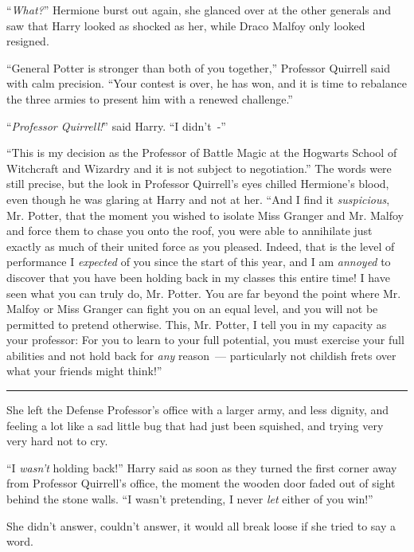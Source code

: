 ``\emph{What?}'' Hermione burst out again, she glanced over at the other generals and saw that Harry looked as shocked as her, while Draco Malfoy only looked resigned.

``General Potter is stronger than both of you together,'' Professor Quirrell said with calm precision. ``Your contest is over, he has won, and it is time to rebalance the three armies to present him with a renewed challenge.''

``\emph{Professor Quirrell!}'' said Harry. ``I didn't~-''

``This is my decision as the Professor of Battle Magic at the Hogwarts School of Witchcraft and Wizardry and it is not subject to negotiation.'' The words were still precise, but the look in Professor Quirrell's eyes chilled Hermione's blood, even though he was glaring at Harry and not at her. ``And I find it \emph{suspicious}, Mr. Potter, that the moment you wished to isolate Miss Granger and Mr. Malfoy and force them to chase you onto the roof, you were able to annihilate just exactly as much of their united force as you pleased. Indeed, that is the level of performance I \emph{expected} of you since the start of this year, and I am \emph{annoyed} to discover that you have been holding back in my classes this entire time! I have seen what you can truly do, Mr. Potter. You are far beyond the point where Mr. Malfoy or Miss Granger can fight you on an equal level, and you will not be permitted to pretend otherwise. This, Mr. Potter, I tell you in my capacity as your professor: For you to learn to your full potential, you must exercise your full abilities and not hold back for \emph{any} reason~--- particularly not childish frets over what your friends might think!''

\begin{center}\rule{3in}{0.4pt}\end{center}

She left the Defense Professor's office with a larger army, and less dignity, and feeling a lot like a sad little bug that had just been squished, and trying very very hard not to cry.

``I \emph{wasn't} holding back!'' Harry said as soon as they turned the first corner away from Professor Quirrell's office, the moment the wooden door faded out of sight behind the stone walls. ``I wasn't pretending, I never \emph{let} either of you win!''

She didn't answer, couldn't answer, it would all break loose if she tried to say a word.

